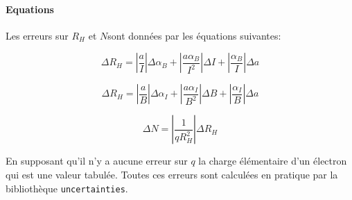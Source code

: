 \paragraph*{Equations}
Les erreurs sur \(R_H\) et \(N\)sont données par les équations suivantes:

\begin{equation}
    \label{eq:erreur:Rh_B}
    \Delta R_H = |\frac{a}{I}|\Delta \alpha_B + |\frac{a \alpha_B}{I^2}|\Delta I + |\frac{\alpha_B}{I}|\Delta a
\end{equation}

\begin{equation}
    \label{eq:erreur:Rh_I}
    \Delta R_H = |\frac{a}{B}|\Delta \alpha_I + |\frac{a \alpha_I}{B^2}|\Delta B + |\frac{\alpha_I}{B}|\Delta a
\end{equation}

\begin{equation}
    \label{eq:erreur:N}
    \Delta N = |\frac{1}{q R_H^2}|\Delta R_H
\end{equation}

En supposant qu'il n'y a aucune erreur sur \(q\) la charge élémentaire d'un électron qui est une valeur tabulée.
Toutes ces erreurs sont calculées en pratique par la bibliothèque \texttt{uncertainties}.
